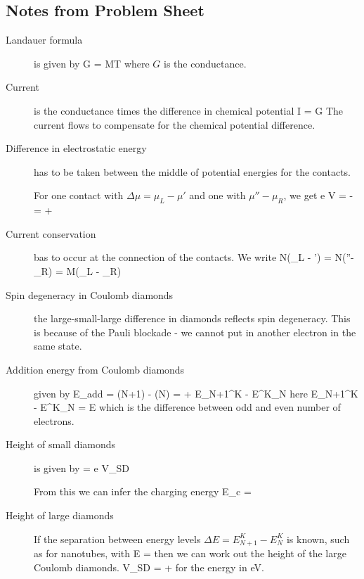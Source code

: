 \subsection{Notes from Problem Sheet}
\begin{description}
\item[Landauer formula] is given by 
\beq
G =  MT
\eeq
where $G$ is the conductance. 

\item[Current] is the conductance times the difference in chemical potential
\beq
I = G 
\eeq
The current flows to compensate for the chemical potential difference. 

\item[Difference in electrostatic energy] has to be taken between the middle of potential energies for the contacts. 

For one contact with $\Delta \mu = \mu_L - \mu'$ and one with $\mu'' - \mu_R$, we get
\beq
e V =  -   =  + 
\eeq

\item[Current conservation] bas to occur at the connection of the contacts.  We write
\beq
N(\mu_L - \mu') = N(\mu''- \mu_R) = M(\mu_L - \mu_R)
\eeq

\item[Spin degeneracy in Coulomb diamonds] the large-small-large difference in diamonds reflects spin degeneracy. This is because of the Pauli blockade - we cannot put in another electron in the same state. 

\item[Addition energy from Coulomb diamonds] given by 
\beq
\Delta E_{add} = \mu(N+1) - \mu(N) =   + E_{N+1}^K - E^K_N
\eeq
here
\beq
E_{N+1}^K - E^K_N = \Delta E
\eeq
which is the difference between odd and even number of electrons. 

\item[Height of small diamonds] is given by 
\beq
{} = e  V_{SD}
\eeq

From this we can infer the charging energy
\beq
E_c = 
\eeq



\item[Height of large diamonds] If the separation between energy levels $\Delta E = E_{N+1}^K - E_N^K$ is known, such as for nanotubes, with 
\beq
\Delta E = 
\eeq
then we can work out the height of the large Coulomb diamonds. 
\beq
V_{SD} =  + 
\eeq
for the energy in eV. 



\end{description}
